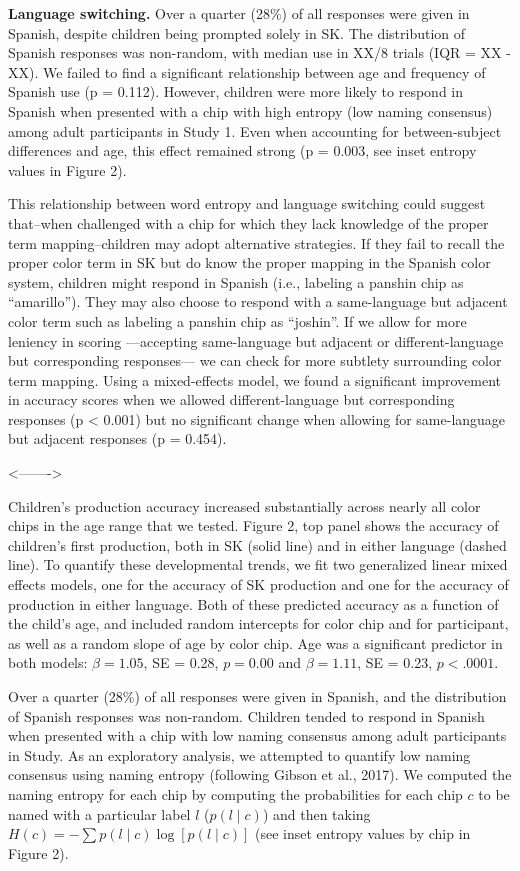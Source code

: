 \documentclass[
  english,
  ,man,floatsintext]{apa6}
\begin{document}
\textbf{Language switching.} Over a quarter (28\%) of all responses were given in Spanish, despite children being prompted solely in SK. The distribution of Spanish responses was non-random, with median use in XX/8 trials (IQR = XX - XX). We failed to find a significant relationship between age and frequency of Spanish use (p = 0.112). However, children were more likely to respond in Spanish when presented with a chip with high entropy (low naming consensus) among adult participants in Study 1. Even when accounting for between-subject differences and age, this effect remained strong (p = 0.003, see inset entropy values in Figure 2).

This relationship between word entropy and language switching could suggest that--when challenged with a chip for which they lack knowledge of the proper term mapping--children may adopt alternative strategies. If they fail to recall the proper color term in SK but do know the proper mapping in the Spanish color system, children might respond in Spanish (i.e., labeling a panshin chip as \enquote{amarillo}). They may also choose to respond with a same-language but adjacent color term such as labeling a panshin chip as \enquote{joshin}. If we allow for more leniency in scoring ---accepting same-language but adjacent or different-language but corresponding responses--- we can check for more subtlety surrounding color term mapping. Using a mixed-effects model, we found a significant improvement in accuracy scores when we allowed different-language but corresponding responses (p \textless{} 0.001) but no significant change when allowing for same-language but adjacent responses (p = 0.454).

\textless-------\textgreater{}

Children's production accuracy increased substantially across nearly all color chips in the age range that we tested. Figure 2, top panel shows the accuracy of children's first production, both in SK (solid line) and in either language (dashed line). To quantify these developmental trends, we fit two generalized linear mixed effects models, one for the accuracy of SK production and one for the accuracy of production in either language. Both of these predicted accuracy as a function of the child's age, and included random intercepts for color chip and for participant, as well as a random slope of age by color chip. Age was a significant predictor in both models: \(\beta = 1.05\), SE = 0.28, \(p = 0.00\) and \(\beta = 1.11\), SE = 0.23, \(p < .0001\).

Over a quarter (28\%) of all responses were given in Spanish, and the distribution of Spanish responses was non-random. Children tended to respond in Spanish when presented with a chip with low naming consensus among adult participants in Study. As an exploratory analysis, we attempted to quantify low naming consensus using naming entropy (following Gibson et al., 2017). We computed the naming entropy for each chip by computing the probabilities for each chip \(c\) to be named with a particular label \(l\) (\(p(l \mid c)\)) and then taking \(H(c) = - \sum{p(l\mid c) \log[p(l \mid c)]}\) (see inset entropy values by chip in Figure 2).
\end{document}
